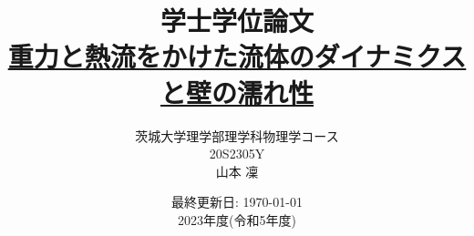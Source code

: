 \documentclass[12pt, dvipdfmx]{jsreport}
\begin{document}
\title{学士学位論文 \\ \href{https://github.com/m-agnet/Report.git}{重力と熱流をかけた流体のダイナミクスと壁の濡れ性}}
\author{茨城大学理学部理学科物理学コース \\ 20S2305Y \\ 山本 凜}
\date{最終更新日: \today \\ 2023年度(令和5年度)}
\maketitle
\newpage

\setcounter{tocdepth}{3}
\tableofcontents
\newpage









\appendix





\end{document}
